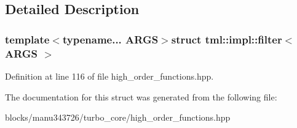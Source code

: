 \subsection{Detailed Description}
\subsubsection*{template$<$typename... A\+R\+G\+S$>$struct tml\+::impl\+::filter$<$ A\+R\+G\+S $>$}



Definition at line 116 of file high\+\_\+order\+\_\+functions.\+hpp.



The documentation for this struct was generated from the following file\+:\begin{DoxyCompactItemize}
\item 
blocks/manu343726/turbo\+\_\+core/high\+\_\+order\+\_\+functions.\+hpp\end{DoxyCompactItemize}
